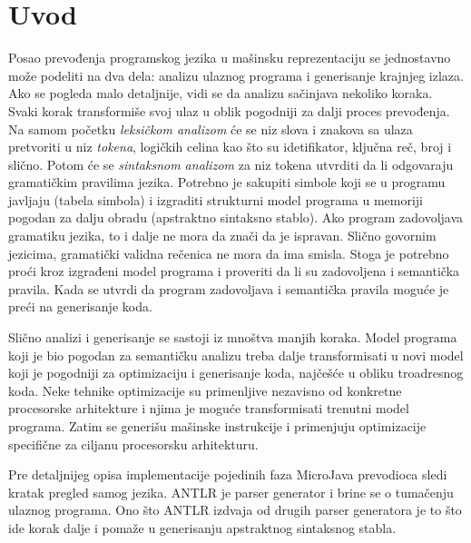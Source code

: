 \chapter{Uvod}
\label{ch:uvod}

Posao prevođenja programskog jezika u mašinsku reprezentaciju se jednostavno može podeliti na dva dela: analizu ulaznog programa i generisanje krajnjeg izlaza. 
Ako se pogleda malo detaljnije, vidi se da analizu sačinjava nekoliko koraka.
Svaki korak transformiše svoj ulaz u oblik pogodniji za dalji proces prevođenja.
Na samom početku \emph{leksičkom analizom} će se niz slova i znakova sa ulaza pretvoriti u niz \emph{tokena}, logičkih celina kao što su idetifikator, ključna reč, broj i slično.
Potom će se \emph{sintaksnom analizom} za niz tokena utvrditi da li odgovaraju gramatičkim pravilima jezika. 
Potrebno je sakupiti simbole koji se u programu javljaju (tabela simbola) i izgraditi strukturni model programa u memoriji pogodan za dalju obradu (apstraktno sintaksno stablo).
Ako program zadovoljava gramatiku jezika, to i dalje ne mora da znači da je ispravan.
Slično govornim jezicima, gramatički validna rečenica ne mora da ima smisla.
Stoga je potrebno proći kroz izgrađeni model programa i proveriti da li su zadovoljena i semantička pravila. 
Kada se utvrdi da program zadovoljava i semantička pravila moguće je preći na generisanje koda.

Slično analizi i generisanje se sastoji iz mnoštva manjih koraka.
Model programa koji je bio pogodan za semantičku analizu treba dalje transformisati u novi model koji je pogodniji za optimizaciju i generisanje koda, najčešće u obliku troadresnog koda.
Neke tehnike optimizacije su primenljive nezavisno od konkretne procesorske arhitekture i njima je moguće transformisati trenutni model programa.
Zatim se generišu mašinske instrukcije i primenjuju optimizacije specifične za ciljanu procesorsku arhitekturu.

Pre detaljnijeg opisa implementacije pojedinih faza MicroJava prevodioca sledi kratak pregled samog jezika. 
ANTLR je parser generator i brine se o tumačenju ulaznog programa.
Ono što ANTLR izdvaja od drugih parser generatora je to što ide korak dalje i pomaže u generisanju apstraktnog sintaksnog stabla.

